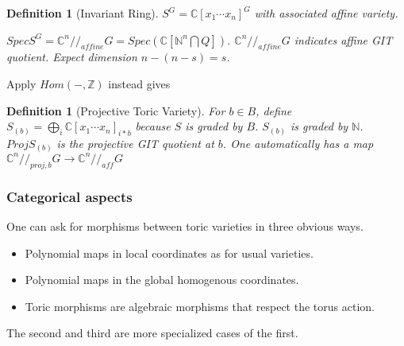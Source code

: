 \documentclass[11pt]{book}
\theoremstyle{change}
\newtheorem{definition}[equation]{Definition}
\theoremstyle{nonumberplain}
\numberwithin{equation}{section}
\begin{document}
\begin{definition}[Invariant Ring]
$S^G = \mathbb{C}[x_1 \cdots x_n]^G$ with associated affine variety.

$Spec S^G = \mathbb{C}^n //_{affine} G = Spec (\mathbb{C}[\mathbb{N}^n \bigcap Q])$. $\mathbb{C}^n //_{affine} G$ indicates affine GIT quotient. Expect dimension $n-(n-s)=s$.
\end{definition}

Apply $Hom (- , \mathbb{Z})$ instead gives

\begin{center}
\end{center}

\begin{definition}[Projective Toric Variety]
For $b \in B$, define $S_{(b)} = \bigoplus_i \mathbb{C}[x_1 \cdots x_n]_{i*b}$ because $S$ is graded by $B$. $S_{(b)}$ is graded by $\mathbb{N}$. $Proj S_{(b)}$ is the projective GIT quotient at $b$. One automatically has a map $\mathbb{C}^n //_{proj,b} G \to \mathbb{C}^n //_{aff} G$
\end{definition}

\subsubsection{Categorical aspects}

One can ask for morphisms between toric varieties in three obvious ways.

\begin{itemize}
\setlength\itemsep{-1em}
\item Polynomial maps in local coordinates as for usual varieties.\\
\item Polynomial maps in the global homogenous coordinates.\\
\item Toric morphisms are algebraic morphisms that respect the torus action.\\
\end{itemize}

The second and third are more specialized cases of the first.
\end{document}
